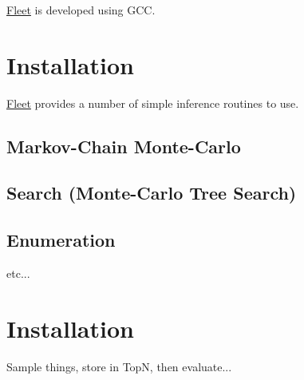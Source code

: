 \hyperlink{namespace_fleet}{Fleet} is developed using G\+CC.\hypertarget{index_install_sec}{}\section{Installation}\label{index_install_sec}
\hyperlink{namespace_fleet}{Fleet} provides a number of simple inference routines to use.\hypertarget{index_step1}{}\subsection{Markov-\/\+Chain Monte-\/\+Carlo}\label{index_step1}
\hypertarget{index_step2}{}\subsection{Search (\+Monte-\/\+Carlo Tree Search)}\label{index_step2}
\hypertarget{index_step3}{}\subsection{Enumeration}\label{index_step3}
etc...\hypertarget{index_install_sec}{}\section{Installation}\label{index_install_sec}

\begin{DoxyItemize}
\item Sample things, store in TopN, then evaluate... 
\end{DoxyItemize}